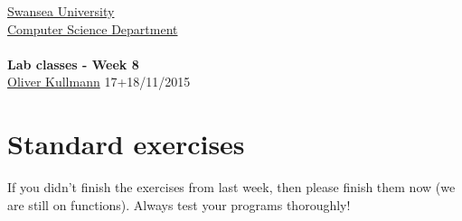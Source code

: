 \documentclass[11pt]{article}
\newcommand{\Java}{\lstset{language=Java,keywordstyle=\bfseries,breaklines,breakindent=30pt}}
\begin{document}
\begin{center}
  \href{http://www.swan.ac.uk/}{Swansea University}\\
  \href{http://www.swan.ac.uk/compsci/}{Computer Science Department}\\[1ex]
  \href{\chp}{\module}\\[1ex]
  \textbf{Lab classes - Week 8}\\
  \href{http://cs.swan.ac.uk/~csoliver}{Oliver Kullmann} 17+18/11/2015
\end{center}


\section{Standard exercises}
\label{sec:stdex}

\Java

If you didn't finish the exercises from last week, then please finish them now (we are still on functions). Always test your programs thoroughly!
\end{document}
